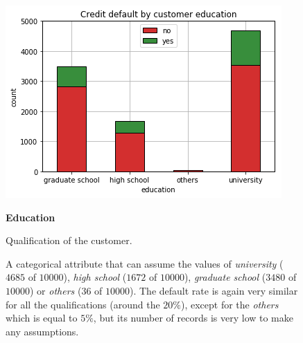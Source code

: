 \begin{figure}[h]
  \begin{minipage}[h]{.50\textwidth}
    \includegraphics[width=.95\textwidth]{img/ch2/education}
  \end{minipage}
  \begin{minipage}[h]{.50\textwidth}
        {\Large \textbf{Education}}
        
        Qualification of the customer.
        
        A categorical attribute that can assume the values of 
        \textit{university} ($4685$ of $10000$),
        \textit{high school} ($1672$ of $10000$),
        \textit{graduate school} ($3480$ of $10000$) or
        \textit{others} ($36$ of $10000$).
        The default rate is again very similar for all the qualifications (around the $20\%$), except for the \textit{others} which is equal to $5\%$, but its number of records is very low to make any assumptions.
  \end{minipage}
\end{figure}

